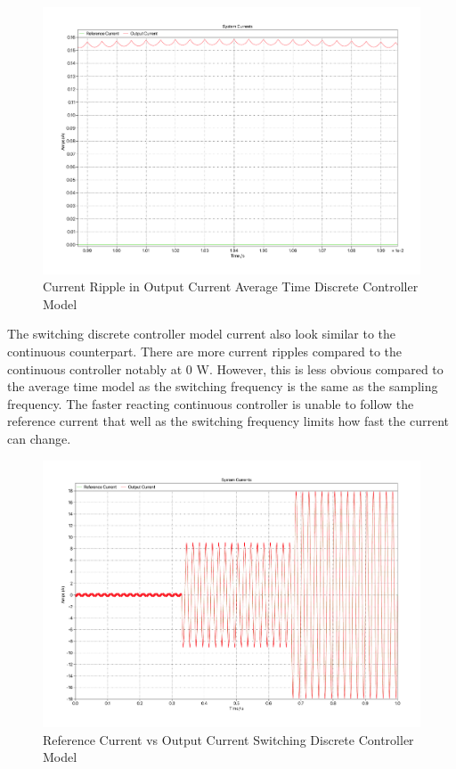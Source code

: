 \documentclass[12pt]{article}
\begin{document}
\begin{figure}[ht]
    \centering{}
    \includegraphics[width=\textwidth, height=0.4\textheight, keepaspectratio]{img/Average Time Z-C Ripple.pdf}
    \caption{Current Ripple in Output Current Average Time Discrete Controller Model}
    \label{fig:avg-time-z-c-current-ripple}
\end{figure}

The switching discrete controller model current also look similar to the continuous counterpart.
There are more current ripples compared to the continuous controller notably at 0 W.
However, this is less obvious compared to the average time model as the switching frequency is the same as the sampling frequency.
The faster reacting continuous controller is unable to follow the reference current that well as the switching frequency limits how fast the current can change.

\begin{figure}[ht]
    \centering{}
    \includegraphics[width=\textwidth, height=0.4\textheight, keepaspectratio]{img/Switching Z-C Current.pdf}
    \caption{Reference Current vs Output Current Switching Discrete Controller Model}
    \label{fig:switching-z-c-current}
\end{figure}
\end{document}

